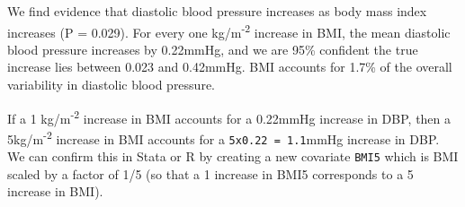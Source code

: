 \documentclass[
  letterpaper,
  DIV=11,
  numbers=noendperiod]{scrreprt}
\newenvironment{Shaded}{\begin{snugshade}}{\end{snugshade}}
\newcommand{\AttributeTok}[1]{\textcolor[rgb]{0.40,0.45,0.13}{#1}}
\newcommand{\CommentTok}[1]{\textcolor[rgb]{0.37,0.37,0.37}{#1}}
\newcommand{\DecValTok}[1]{\textcolor[rgb]{0.68,0.00,0.00}{#1}}
\newcommand{\DocumentationTok}[1]{\textcolor[rgb]{0.37,0.37,0.37}{\textit{#1}}}
\newcommand{\FunctionTok}[1]{\textcolor[rgb]{0.28,0.35,0.67}{#1}}
\newcommand{\NormalTok}[1]{\textcolor[rgb]{0.00,0.23,0.31}{#1}}
\newcommand{\OtherTok}[1]{\textcolor[rgb]{0.00,0.23,0.31}{#1}}
\newcommand{\SpecialCharTok}[1]{\textcolor[rgb]{0.37,0.37,0.37}{#1}}
\begin{document}
\begin{Shaded}
\end{Shaded}

We find evidence that diastolic blood pressure increases as body mass
index increases (P = 0.029). For every one kg/m\textsuperscript{-2}
increase in BMI, the mean diastolic blood pressure increases by
0.22mmHg, and we are 95\% confident the true increase lies between 0.023
and 0.42mmHg. BMI accounts for 1.7\% of the overall variability in
diastolic blood pressure.

If a 1 kg/m\textsuperscript{-2} increase in BMI accounts for a 0.22mmHg
increase in DBP, then a 5kg/m\textsuperscript{-2} increase in BMI
accounts for a \texttt{5x0.22\ =\ 1.1}mmHg increase in DBP. We can
confirm this in Stata or R by creating a new covariate \texttt{BMI5}
which is BMI scaled by a factor of 1/5 (so that a 1 increase in BMI5
corresponds to a 5 increase in BMI).
\end{document}

